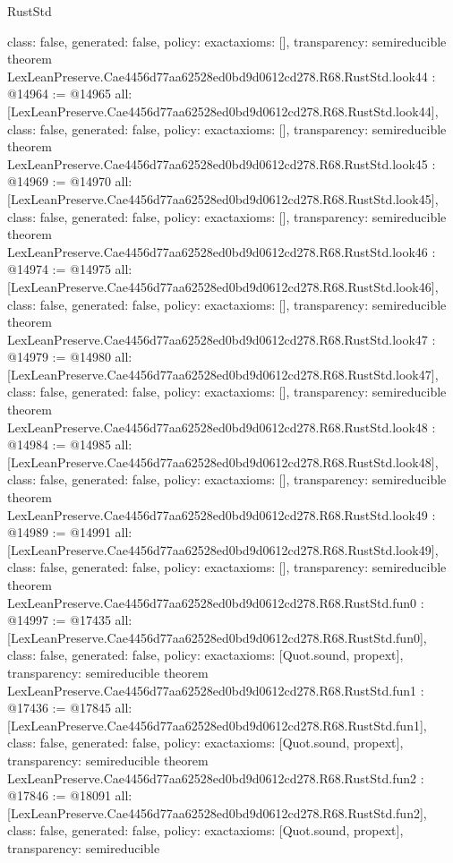 \begin{lexlean}{RustStd}
\begin{coremodule}
{  class: false,
  generated: false,
  policy: exact{axioms: []},
  transparency: semireducible
}
theorem LexLeanPreserve.Cae4456d77aa62528ed0bd9d0612cd278.R68.RustStd.look44 : @14964 := @14965 {
  all: [LexLeanPreserve.Cae4456d77aa62528ed0bd9d0612cd278.R68.RustStd.look44],
  class: false,
  generated: false,
  policy: exact{axioms: []},
  transparency: semireducible
}
theorem LexLeanPreserve.Cae4456d77aa62528ed0bd9d0612cd278.R68.RustStd.look45 : @14969 := @14970 {
  all: [LexLeanPreserve.Cae4456d77aa62528ed0bd9d0612cd278.R68.RustStd.look45],
  class: false,
  generated: false,
  policy: exact{axioms: []},
  transparency: semireducible
}
theorem LexLeanPreserve.Cae4456d77aa62528ed0bd9d0612cd278.R68.RustStd.look46 : @14974 := @14975 {
  all: [LexLeanPreserve.Cae4456d77aa62528ed0bd9d0612cd278.R68.RustStd.look46],
  class: false,
  generated: false,
  policy: exact{axioms: []},
  transparency: semireducible
}
theorem LexLeanPreserve.Cae4456d77aa62528ed0bd9d0612cd278.R68.RustStd.look47 : @14979 := @14980 {
  all: [LexLeanPreserve.Cae4456d77aa62528ed0bd9d0612cd278.R68.RustStd.look47],
  class: false,
  generated: false,
  policy: exact{axioms: []},
  transparency: semireducible
}
theorem LexLeanPreserve.Cae4456d77aa62528ed0bd9d0612cd278.R68.RustStd.look48 : @14984 := @14985 {
  all: [LexLeanPreserve.Cae4456d77aa62528ed0bd9d0612cd278.R68.RustStd.look48],
  class: false,
  generated: false,
  policy: exact{axioms: []},
  transparency: semireducible
}
theorem LexLeanPreserve.Cae4456d77aa62528ed0bd9d0612cd278.R68.RustStd.look49 : @14989 := @14991 {
  all: [LexLeanPreserve.Cae4456d77aa62528ed0bd9d0612cd278.R68.RustStd.look49],
  class: false,
  generated: false,
  policy: exact{axioms: []},
  transparency: semireducible
}
theorem LexLeanPreserve.Cae4456d77aa62528ed0bd9d0612cd278.R68.RustStd.fun0 : @14997 := @17435 {
  all: [LexLeanPreserve.Cae4456d77aa62528ed0bd9d0612cd278.R68.RustStd.fun0],
  class: false,
  generated: false,
  policy: exact{axioms: [Quot.sound, propext]},
  transparency: semireducible
}
theorem LexLeanPreserve.Cae4456d77aa62528ed0bd9d0612cd278.R68.RustStd.fun1 : @17436 := @17845 {
  all: [LexLeanPreserve.Cae4456d77aa62528ed0bd9d0612cd278.R68.RustStd.fun1],
  class: false,
  generated: false,
  policy: exact{axioms: [Quot.sound, propext]},
  transparency: semireducible
}
theorem LexLeanPreserve.Cae4456d77aa62528ed0bd9d0612cd278.R68.RustStd.fun2 : @17846 := @18091 {
  all: [LexLeanPreserve.Cae4456d77aa62528ed0bd9d0612cd278.R68.RustStd.fun2],
  class: false,
  generated: false,
  policy: exact{axioms: [Quot.sound, propext]},
  transparency: semireducible
}
\end{coremodule}
\end{lexlean}
